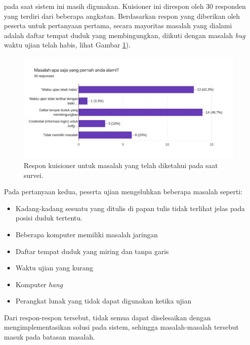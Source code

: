     pada saat sistem ini masih digunakan. Kuisioner ini direspon oleh 30
    responden yang terdiri dari beberapa angkatan. Berdasarkan respon yang
    diberikan oleh peserta untuk pertanyaan pertama, secara mayoritas masalah
    yang dialami adalah daftar tempat duduk yang membingungkan, diikuti dengan
    masalah \textit{bug} waktu ujian telah habis, lihat Gambar
    \ref{fig:kuisioner-student-1}).
    \begin{figure}
        \centering
        \includegraphics[width=0.7\paperwidth]{Gambar/survey-student.pdf}
        \caption{Respon kuisioner untuk masalah yang telah diketahui pada saat survei.}
        \label{fig:kuisioner-student-1}
    \end{figure}

    Pada pertanyaan kedua, peserta ujian mengeluhkan beberapa masalah seperti:
    \begin{itemize}
        \item Kadang-kadang sesuatu yang ditulis di papan tulis tidak terlihat
        jelas pada posisi duduk tertentu.
        
        \item Beberapa komputer memiliki masalah jaringan
        
        \item Daftar tempat duduk yang miring dan tanpa garis
        
        \item Waktu ujian yang kurang
        
        \item Komputer \textit{hang}
        
        \item Perangkat lunak yang tidak dapat digunakan ketika ujian
    \end{itemize}
    Dari respon-respon tersebut, tidak semua dapat diselesaikan dengan
    mengimplementasikan solusi pada sistem, sehingga masalah-masalah tersebut
    masuk pada batasan masalah.

